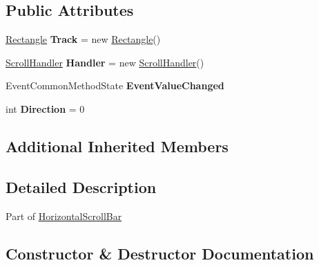 \subsection*{Public Attributes}
\begin{DoxyCompactItemize}
\item 
\mbox{\label{class_space_v_i_l_1_1_horizontal_slider_aa72646a82b35d8b489d1b987cab1e762}} 
\mbox{\hyperlink{class_space_v_i_l_1_1_rectangle}{Rectangle}} {\bfseries Track} = new \mbox{\hyperlink{class_space_v_i_l_1_1_rectangle}{Rectangle}}()
\item 
\mbox{\label{class_space_v_i_l_1_1_horizontal_slider_a4942181895d7179ca2468b4c8d8f9c08}} 
\mbox{\hyperlink{class_space_v_i_l_1_1_scroll_handler}{Scroll\+Handler}} {\bfseries Handler} = new \mbox{\hyperlink{class_space_v_i_l_1_1_scroll_handler}{Scroll\+Handler}}()
\item 
\mbox{\label{class_space_v_i_l_1_1_horizontal_slider_ac1943276ef4514830f20e7b39f4ab432}} 
Event\+Common\+Method\+State {\bfseries Event\+Value\+Changed}
\item 
\mbox{\label{class_space_v_i_l_1_1_horizontal_slider_a707283159cd6c072bff6ade84ac3a601}} 
int {\bfseries Direction} = 0
\end{DoxyCompactItemize}
\subsection*{Additional Inherited Members}


\subsection{Detailed Description}
Part of \mbox{\hyperlink{class_space_v_i_l_1_1_horizontal_scroll_bar}{Horizontal\+Scroll\+Bar}} 



\subsection{Constructor \& Destructor Documentation}
\mbox{\label{class_space_v_i_l_1_1_horizontal_slider_ae040dcab9cc4d7c00b949b47adc0eeb5}} 
